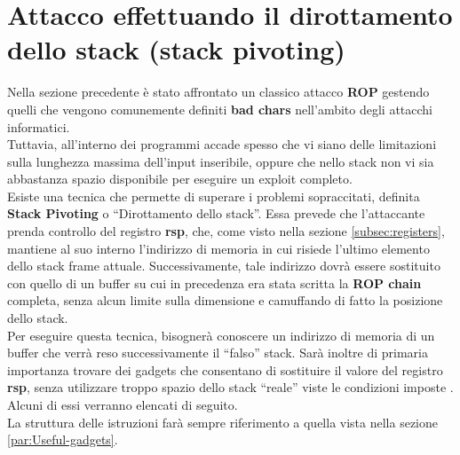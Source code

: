 \section{Attacco effettuando il dirottamento dello stack (stack pivoting)}
\label{sec:Attack_2}
Nella sezione precedente è stato affrontato un classico attacco \textbf{ROP} gestendo quelli che vengono comunemente definiti \textbf{bad chars} nell'ambito degli attacchi informatici.\\
Tuttavia, all'interno dei programmi accade spesso che vi siano delle limitazioni sulla lunghezza massima dell'input inseribile, oppure che nello stack non vi sia abbastanza spazio disponibile per eseguire un exploit completo.\\
Esiste una tecnica che permette di superare i problemi sopraccitati, definita \textbf{Stack Pivoting} o ``Dirottamento dello stack''. Essa prevede che l'attaccante prenda controllo del registro 
\textbf{rsp}, che, come visto nella sezione \ref{subsec:registers}, mantiene al suo interno l'indirizzo di memoria in cui risiede l'ultimo elemento dello stack frame attuale. Successivamente, tale indirizzo dovrà essere sostituito con quello di un buffer su cui in precedenza era stata scritta la \textbf{ROP chain} completa, senza alcun 
limite sulla dimensione e camuffando di fatto la posizione dello stack.\\ 
Per eseguire questa tecnica, bisognerà conoscere un indirizzo di memoria di un buffer che verrà reso successivamente il ``falso'' stack. Sarà inoltre di primaria importanza trovare dei gadgets che consentano di sostituire il valore del registro \textbf{rsp}, senza utilizzare troppo spazio dello
stack ``reale'' viste le condizioni imposte \cite*{Stack-pivoting}. Alcuni di essi verranno elencati di seguito.\\
La struttura delle istruzioni farà sempre riferimento a quella vista nella sezione \ref{par:Useful-gadgets}.
